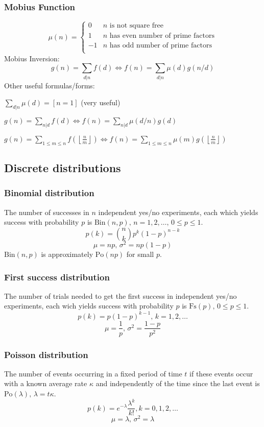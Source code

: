 \documentclass[
	a4paper,
	landscape,
	10pt,
]{article}
\begin{document}
\begin{multicols}{3}
\subsubsection*{Mobius Function}
\[
	\mu(n) = \begin{cases} 0 & n \textrm{ is not square free}\\ 1 & n \textrm{ has even number of prime factors}\\ -1 & n \textrm{ has odd number of prime factors}\\\end{cases}
\]
  Mobius Inversion:
  \[ g(n) = \sum_{d|n} f(d) \Leftrightarrow f(n) = \sum_{d|n} \mu(d)g(n/d) \]
  Other useful formulas/forms:

  $ \sum_{d | n} \mu(d) = [ n = 1] $ (very useful)

  $ g(n) = \sum_{n|d} f(d) \Leftrightarrow f(n) = \sum_{n|d} \mu(d/n)g(d)$

 $ g(n) = \sum_{1 \leq m \leq n} f(\left\lfloor\frac{n}{m}\right \rfloor ) \Leftrightarrow f(n) = \sum_{1\leq m\leq n} \mu(m)g(\left\lfloor\frac{n}{m}\right\rfloor)$



\subsection{Discrete distributions}

\subsubsection*{Binomial distribution}
The number of successes in $n$ independent yes/no experiments, each which yields success with probability $p$ is $\textrm{Bin}(n,p),\,n=1,2,\dots,\, 0\leq p\leq1$.
\[p(k)=\binom{n}{k}p^k(1-p)^{n-k}\]
\[\mu = np,\,\sigma^2=np(1-p)\]
$\textrm{Bin}(n,p)$ is approximately $\textrm{Po}(np)$ for small $p$.

\subsubsection*{First success distribution}
The number of trials needed to get the first success in independent yes/no experiments, each wich yields success with probability $p$ is $\textrm{Fs}(p),\,0\leq p\leq1$.
\[p(k)=p(1-p)^{k-1},\,k=1,2,\dots\]
\[\mu = \frac1p,\,\sigma^2=\frac{1-p}{p^2}\]

\subsubsection*{Poisson distribution}
The number of events occurring in a fixed period of time $t$ if these events occur with a known average rate $\kappa$ and independently of the time since the last event is $\textrm{Po}(\lambda),\,\lambda=t\kappa$.
\[p(k)=e^{-\lambda}\frac{\lambda^k}{k!}, k=0,1,2,\dots\]
\[\mu=\lambda,\,\sigma^2=\lambda\]


\end{multicols}
\end{document}
